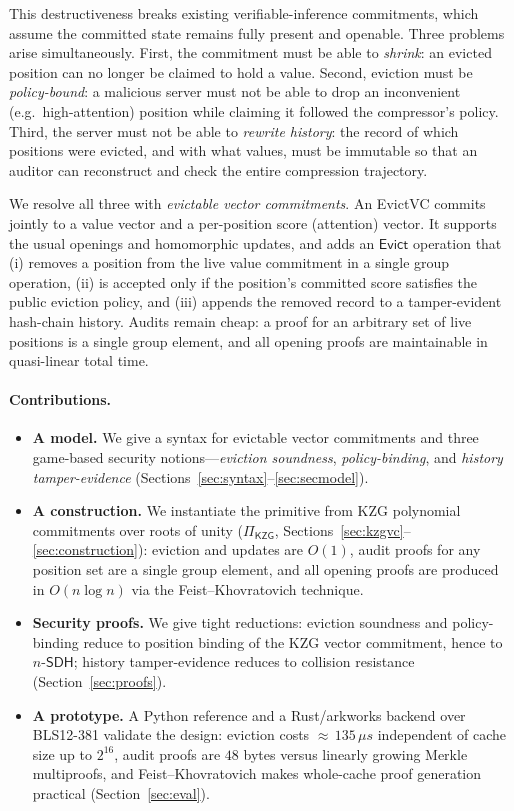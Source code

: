 \documentclass[version=preprint]{iacrcc}
\theoremstyle{definition}
\newcommand{\Evict}{\mathsf{Evict}}
\newcommand{\nsdh}{n\text{-}\mathsf{SDH}}
\begin{document}
This destructiveness breaks existing verifiable-inference commitments, which
assume the committed state remains fully present and openable. Three problems
arise simultaneously. First, the commitment must be able to \emph{shrink}: an
evicted position can no longer be claimed to hold a value. Second, eviction must
be \emph{policy-bound}: a malicious server must not be able to drop an
inconvenient (e.g.\ high-attention) position while claiming it followed the
compressor's policy. Third, the server must not be able to \emph{rewrite history}:
the record of which positions were evicted, and with what values, must be
immutable so that an auditor can reconstruct and check the entire compression
trajectory.

We resolve all three with \emph{evictable vector commitments}. An EvictVC commits
jointly to a value vector and a per-position score (attention) vector. It
supports the usual openings and homomorphic updates, and adds an $\Evict$
operation that (i) removes a position from the live value commitment in a single
group operation, (ii) is accepted only if the position's committed score
satisfies the public eviction policy, and (iii) appends the removed record to a
tamper-evident hash-chain history. Audits remain cheap: a proof for an arbitrary
set of live positions is a single group element, and all opening proofs are
maintainable in quasi-linear total time.

\paragraph{Contributions.}
\begin{itemize}[leftmargin=1.4em,itemsep=2pt]
  \item \textbf{A model.} We give a syntax for evictable vector commitments and
        three game-based security notions---\emph{eviction soundness},
        \emph{policy-binding}, and \emph{history tamper-evidence}
        (Sections~\ref{sec:syntax}--\ref{sec:secmodel}).
  \item \textbf{A construction.} We instantiate the primitive from KZG
        polynomial commitments over roots of unity ($\Pi_{\mathsf{KZG}}$,
        Sections~\ref{sec:kzgvc}--\ref{sec:construction}): eviction and updates
        are $O(1)$, audit proofs for any position set are a single group
        element, and all opening proofs are produced in $O(n\log n)$ via the
        Feist--Khovratovich technique.
  \item \textbf{Security proofs.} We give tight reductions: eviction soundness
        and policy-binding reduce to position binding of the KZG vector
        commitment, hence to $\nsdh$; history tamper-evidence reduces to
        collision resistance (Section~\ref{sec:proofs}).
  \item \textbf{A prototype.} A Python reference and a Rust/arkworks backend over
        BLS12-381 validate the design: eviction costs ${\approx}\,135\,\mu s$
        independent of cache size up to $2^{16}$, audit proofs are $48$ bytes
        versus linearly growing Merkle multiproofs, and Feist--Khovratovich makes
        whole-cache proof generation practical (Section~\ref{sec:eval}).
\end{itemize}
\end{document}
